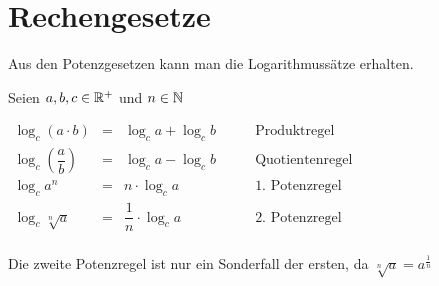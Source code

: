 	\section{Rechengesetze}

Aus den Potenzgesetzen kann man die Logarithmussätze erhalten.

\begin{Theorem}
Seien $a,b,c\in\mathbb{R}^+$ und $n\in\mathbb{N}$\\
\begin{center}
$\begin{array}{cccl}
\log_c(a\cdot b)&=&\log_ca+\log_cb&\qquad\mbox {Produktregel}\\
\log_c\left(\dfrac{a}{b}\right)&=&\log_ca-\log_cb&\qquad\mbox{Quotientenregel}\\
\log_ca^n&=&n\cdot\log_ca&\qquad\mbox{1. Potenzregel}\\
\log_c\sqrt[n]{a}&=&\dfrac{1}{n}\cdot\log_ca&\qquad\mbox{2. Potenzregel}\\
\end{array}$
\end{center}
\end{Theorem}

\begin{Bemerkung}
Die zweite Potenzregel ist nur ein Sonderfall der ersten, da $\sqrt[n]{a}=a^{\frac{1}{n}}$
\end{Bemerkung}